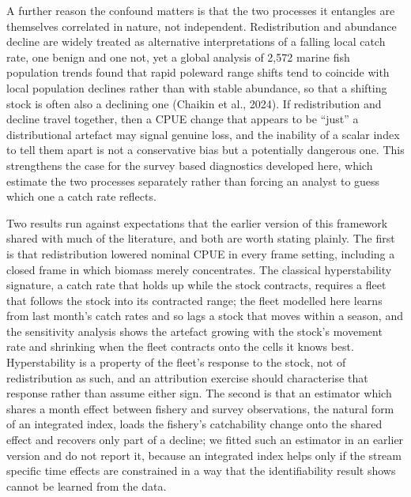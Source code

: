 \documentclass[
  11pt,
  a4paper,
]{article}
\begin{document}
A further reason the confound matters is that the two processes it
entangles are themselves correlated in nature, not independent.
Redistribution and abundance decline are widely treated as alternative
interpretations of a falling local catch rate, one benign and one not,
yet a global analysis of 2,572 marine fish population trends found that
rapid poleward range shifts tend to coincide with local population
declines rather than with stable abundance, so that a shifting stock is
often also a declining one (Chaikin et al., 2024). If redistribution and
decline travel together, then a CPUE change that appears to be ``just''
a distributional artefact may signal genuine loss, and the inability of
a scalar index to tell them apart is not a conservative bias but a
potentially dangerous one. This strengthens the case for the survey
based diagnostics developed here, which estimate the two processes
separately rather than forcing an analyst to guess which one a catch
rate reflects.

Two results run against expectations that the earlier version of this
framework shared with much of the literature, and both are worth stating
plainly. The first is that redistribution lowered nominal CPUE in every
frame setting, including a closed frame in which biomass merely
concentrates. The classical hyperstability signature, a catch rate that
holds up while the stock contracts, requires a fleet that follows the
stock into its contracted range; the fleet modelled here learns from
last month's catch rates and so lags a stock that moves within a season,
and the sensitivity analysis shows the artefact growing with the stock's
movement rate and shrinking when the fleet contracts onto the cells it
knows best. Hyperstability is a property of the fleet's response to the
stock, not of redistribution as such, and an attribution exercise should
characterise that response rather than assume either sign. The second is
that an estimator which shares a month effect between fishery and survey
observations, the natural form of an integrated index, loads the
fishery's catchability change onto the shared effect and recovers only
part of a decline; we fitted such an estimator in an earlier version and
do not report it, because an integrated index helps only if the stream
specific time effects are constrained in a way that the identifiability
result shows cannot be learned from the data.
\end{document}
